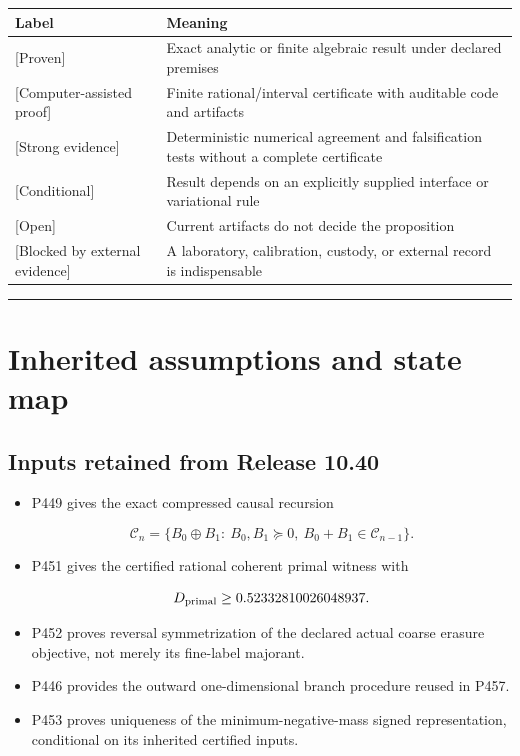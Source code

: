 \documentclass[11pt,a4paper,openany]{report}
\newcommand{\statusProven}{\textcolor{fingreen}{[Proven]}}
\newcommand{\statusStrong}{\textcolor{finblue}{[Strong evidence]}}
\begin{document}
\begin{center}
\begingroup\small
\setlength{\tabcolsep}{2.5pt}
\renewcommand{\arraystretch}{1.16}
\begin{longtable}{@{}p{}p{}@{}}
\toprule
\textbf{Label} & \textbf{Meaning} \\
\midrule
\endhead
\statusProven{} & Exact analytic or finite algebraic result under declared premises \\
\textcolor{fingreen}{[Computer-assisted proof]} & Finite rational/\allowbreak{}interval certificate with auditable code and artifacts \\
\statusStrong{} & Deterministic numerical agreement and falsification tests without a complete certificate \\
\textcolor{finviolet}{[Conditional]} & Result depends on an explicitly supplied interface or variational rule \\
\textcolor{finorange}{[Open]} & Current artifacts do not decide the proposition \\
\textcolor{finred}{[Blocked by external evidence]} & A laboratory, calibration, custody, or external record is indispensable \\
\bottomrule
\end{longtable}
\endgroup
\end{center}

\par\medskip\hrule\medskip

\chapter{Inherited assumptions and state map}

\section{Inputs retained from Release 10.40}

\begin{itemize}
\item 
P449 gives the exact compressed causal recursion

\[
  \mathcal C_n=
  \{B_0\oplus B_1:\ B_0,B_1\succeq0,
  \ B_0+B_1\in\mathcal C_{n-1}\}.
  \]

\item 
P451 gives the certified rational coherent primal witness with

\[
  D_{\rm primal}\ge0.52332810026048937.
  \]

\item 
P452 proves reversal symmetrization of the declared actual coarse erasure objective, not merely its fine-label majorant.

\item 
P446 provides the outward one-dimensional branch procedure reused in P457.

\item 
P453 proves uniqueness of the minimum-negative-mass signed representation, conditional on its inherited certified inputs.

\end{itemize}
\end{document}
